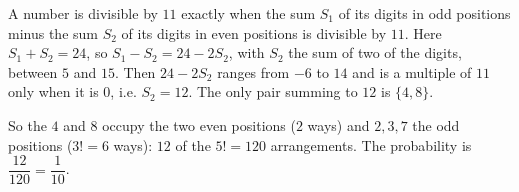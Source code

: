 A number is divisible by $11$ exactly when the sum $S_1$ of its digits in odd positions minus the sum $S_2$ of its digits in even positions is divisible by $11$. Here $S_1+S_2=24$, so $S_1-S_2=24-2S_2$, with $S_2$ the sum of two of the digits, between $5$ and $15$. Then $24-2S_2$ ranges from $-6$ to $14$ and is a multiple of $11$ only when it is $0$, i.e. $S_2=12$. The only pair summing to $12$ is $\{4,8\}$.

So the $4$ and $8$ occupy the two even positions ($2$ ways) and $2,3,7$ the odd positions ($3!=6$ ways): $12$ of the $5!=120$ arrangements. The probability is $\dfrac{12}{120}=\boxed{\dfrac{1}{10}}$.
